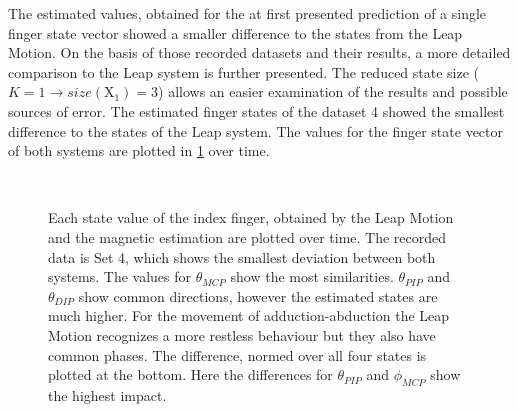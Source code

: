 The estimated values, obtained for the at first presented prediction of a single finger state vector showed a smaller difference to the states from the Leap Motion. On the basis of those recorded datasets and their results, a more detailed comparison to the Leap system is further presented. The reduced state size ($ K = 1 \rightarrow size(\mathrm{X}_{1}) = 3 $) allows an easier examination of the results and possible sources of error. The estimated finger states of the dataset 4 showed the smallest difference to the states of the Leap system. The values for the finger state vector of both systems are plotted in \ref{fig:bestLeap} over time.
\begin{figure}
\centering
{}\\
\caption[Comparison of estimated states, which fit best to Leap data]
{Each state value of the index finger, obtained by the Leap Motion and the magnetic estimation are plotted over time. The recorded data is Set 4, which shows the smallest deviation between both systems. The values for $ \theta_{MCP} $ show the most similarities. $ \theta_{PIP} $ and $ \theta_{DIP} $ show common directions, however the estimated states are much higher. For the movement of adduction-abduction the Leap Motion recognizes a more restless behaviour but they also have common phases. The difference, normed over all four states is plotted at the bottom. Here the differences for $ \theta_{PIP} $ and $ \phi_{MCP} $ show the highest impact.}
\label{fig:bestLeap}
\end{figure} 
